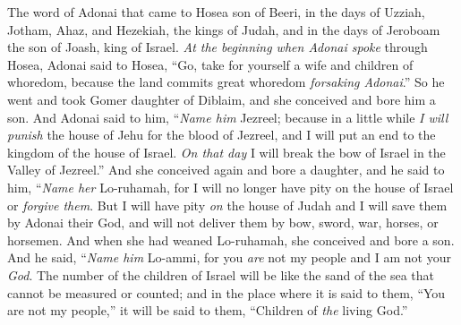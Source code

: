 
\begin{biblechapter} %
 The word of Adonai that came to Hosea son of Beeri, in the days of Uzziah, Jotham, Ahaz, and Hezekiah, the kings of Judah, and in the days of Jeroboam the son of Joash, king of Israel.
\verse \textit{At the beginning when Adonai spoke} through Hosea, 
Adonai said to Hosea, 
“Go, take for yourself a wife and children of whoredom, 
because the land commits great whoredom 
\textit{forsaking Adonai}.”
\verse So he went and took Gomer daughter of Diblaim, 
and she conceived and bore him a son.
\verse And Adonai said to him, 
“\textit{Name him} Jezreel; 
because in a little while \textit{I will punish} the house of Jehu 
for the blood of Jezreel, 
and I will put an end to the kingdom of the house of Israel.
\verse \textit{On that day} 
I will break the bow of Israel 
in the Valley of Jezreel.”
\verse And she conceived again and bore a daughter, and he said to him,
\verse “\textit{Name her} Lo-ruhamah, 
for I will no longer have pity 
on the house of Israel 
or \textit{forgive them}.
\verse But I will have pity \textit{on} the house of Judah 
and I will save them by Adonai their God, 
and will not deliver them 
by bow, sword, war, 
horses, or horsemen.
\verse And when she had weaned Lo-ruhamah, she conceived and bore a son.
\verse And he said, “\textit{Name him} Lo-ammi, 
for you \textit{are} not my people 
and I am not your \textit{God}.
\verse  The number of the children of Israel 
will be like the sand of the sea 
that cannot be measured or counted; 
and in the place where it is said to them, 
“You are not my people,” 
it will be said to them, 
“Children of \textit{the} living God.”
\end{biblechapter}

